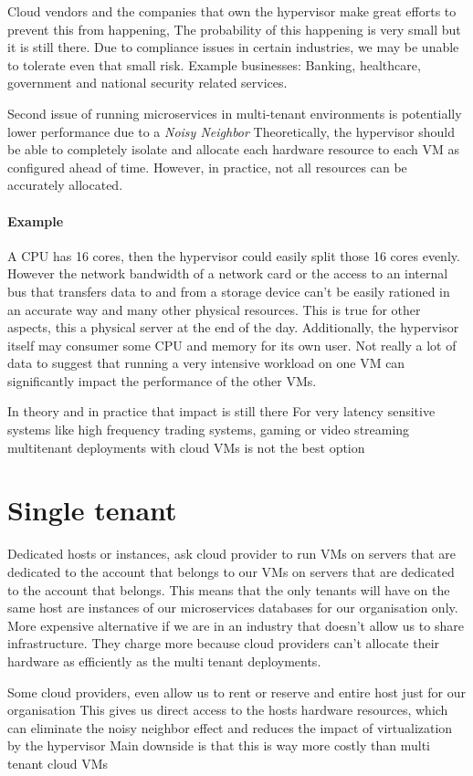 Cloud vendors and the companies that own the hypervisor make great efforts to prevent this from happening,
The probability of this happening is very small but it is still there.
Due to compliance issues in certain industries, we may be unable to tolerate even that small risk.
Example businesses: Banking, healthcare, government and national security related services.

Second issue of running microservices in multi-tenant environments is potentially lower performance due to a \textit{Noisy Neighbor}
Theoretically, the hypervisor should be able to completely isolate and allocate each hardware resource to each VM as configured ahead of time.
However, in practice, not all resources can be accurately allocated.

\paragraph{Example}
A CPU has 16 cores, then the hypervisor could easily split those 16 cores evenly.
However the network bandwidth of a network card or the access to an internal bus that transfers data to and from a storage device can't be easily rationed in an accurate way and many other physical resources.
This is true for other aspects, this a physical server at the end of the day.
Additionally, the hypervisor itself may consumer some CPU and memory for its own user.
Not really a lot of data to suggest that running a very intensive workload on one VM can significantly impact the performance of the other VMs.

In theory and in practice that impact is still there
For very latency sensitive systems like high frequency trading systems, gaming or video streaming multitenant deployments with cloud VMs is not the best option

\section{Single tenant}
Dedicated hosts or instances, ask cloud provider to run VMs on servers that are dedicated to the account that belongs to our VMs on servers that are dedicated to the account that belongs.
This means that the only tenants will have on the same host are instances of our microservices databases for our organisation only.
More expensive alternative if we are in an industry that doesn't allow us to share infrastructure.
They charge more because cloud providers can't allocate their hardware as efficiently as the multi tenant deployments.

Some cloud providers, even allow us to rent or reserve and entire host just for our organisation
This gives us direct access to the hosts hardware resources, which can eliminate the noisy neighbor effect and reduces the impact of virtualization by the hypervisor
Main downside is that this is way more costly than multi tenant cloud VMs